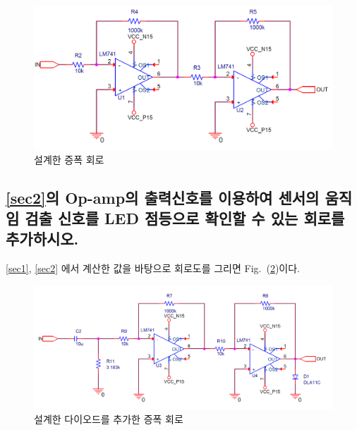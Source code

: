 \documentclass{article}
\begin{document}
\begin{figure}[H]
    \centering
    \includegraphics[width=0.7\linewidth]{figures/fig2.png}
    \caption{설계한 증폭 회로}
    \label{fig2}
\end{figure}

\subsection{\ref{sec2}의 Op-amp의 출력신호를 이용하여 센서의 움직임 검출 신호를 LED 점등으로 확인할 수 있는 회로를 추가하시오.}
\ref{sec1}, \ref{sec2} 에서 계산한 값을 바탕으로 회로도를 그리면 Fig.~(\ref{fig3})이다.

\begin{figure}[H]
    \centering
    \includegraphics[width=0.7\linewidth]{figures/fig3.png}
    \caption{설계한 다이오드를 추가한 증폭 회로}
    \label{fig3}
\end{figure}




\end{document}
